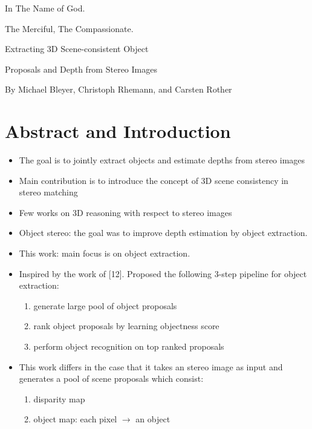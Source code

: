\documentclass[a4paper,12pt]{article}
\begin{document}
\begin{center}
In The Name of God.

The Merciful, The Compassionate.
\vskip 1cm
{\Large\bfseries{Extracting 3D Scene-consistent Object

Proposals and Depth from Stereo Images}}

\vskip 0.2cm
\tiny{By Michael Bleyer, Christoph Rhemann, and Carsten Rother}
\end{center}

\section{Abstract and Introduction}
\begin{itemize}
\item The goal is to jointly extract objects and estimate depths from stereo images
\item Main contribution is to introduce the concept of 3D scene consistency in stereo matching
\item Few works on 3D reasoning with respect to stereo images
\item Object stereo: the goal was to improve depth estimation by object extraction.
\item This work: main focus is on object extraction.
\item Inspired by the work of [12]. Proposed the following 3-step pipeline for object extraction:
\begin{enumerate}
\item generate large pool of object proposals
\item rank object proposals by learning objectness score
\item perform object recognition on top ranked proposals
\end{enumerate}
\item This work differs in the case that it takes an stereo image as input and generates a pool of scene proposals which consist:
\begin{enumerate}
\item disparity map
\item object map: each pixel $\longrightarrow$ an object
\end{enumerate}
\end{itemize}
\end{document}
